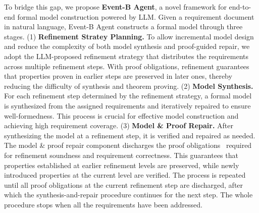 To bridge this gap, we propose \textbf{Event-B Agent}, a novel framework for end-to-end formal model construction powered by LLM. 
Given a requirement document in natural language, Event-B Agent constructs a formal model through three stages.
(1) \textbf{Refinement Stratey Planning.}
To allow incremental model design and reduce the complexity of both model synthesis and proof-guided repair, we adopt the LLM-proposed refinement strategy that distributes the requirements across multiple refinement steps.
With proof obligations, refinement guarantees that properties proven in earlier steps are preserved in later ones, thereby reducing the difficulty of synthesis and theorem proving.
(2) \textbf{Model Synthesis.}
For each refinement step determined by the refinement strategy, a formal model is synthesized from the assigned requirements and iteratively repaired to ensure well-formedness.
This process is crucial for effective model construction and achieving high requirement coverage.
(3) \textbf{Model \& Proof Repair.}
After synthesizing the model at a refinement step, it is verified and repaired as needed.
The model \& proof repair component discharges the proof obligations~\cite{abrial2010modeling} required for refinement soundness and requirement correctness.
This guarantees that properties established at earlier refinement levels are preserved, while newly introduced properties at the current level are verified.
The process is repeated until all proof obligations at the current refinement step are discharged, after which the synthesis-and-repair procedure continues for the next step.
The whole procedure stops when all the requirements have been addressed.

